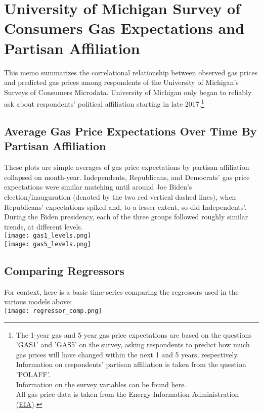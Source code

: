 \documentclass{article}
\begin{document}
\section{University of Michigan Survey of Consumers Gas Expectations and Partisan Affiliation}

This memo summarizes the correlational relationship between observed gas prices and predicted gas prices among respondents of the University of Michigan's Surveys of Consumers Microdata. University of Michigan only began to reliably ask about respondents' political affiliation starting in late 2017.\footnote{The 1-year gas and 5-year gas price expectations are based on the questions 'GAS1' and 'GAS5' on the survey, asking respondents to predict how much gas prices will have changed within the next 1 and 5 years, respectively. \\  Information on respondents' partisan affiliation is taken from the question 'POLAFF'. \\ Information on the survey variables can be found \href{https://sda.umsurvey.org/sca/Doc/sca.htm}{here}. \\ All gas price data is taken from the Energy Information Administration (\href{https://www.eia.gov/dnav/pet/hist/LeafHandler.ashx?n=pet&s=emm_epm0_pte_nus_dpg&f=m}{EIA}).}

\subsection{Average Gas Price Expectations Over Time By Partisan Affiliation}

These plots are simple averages of gas price expectations by partisan affiliation collapsed on month-year. Independents, Republicans, and Democrats' gas price expectations were similar matching until around Joe Biden's election/inauguration (denoted by the two red vertical dashed lines), when Republicans' expectations spiked and, to a lesser extent, so did Independents'. During the Biden presidency, each of the three groups followed roughly similar trends, at different levels. \\

\centering \texttt{[image: gas1\_levels.png]} \\
\texttt{[image: gas5\_levels.png]}

\raggedright \subsection{Comparing Regressors} 
For context, here is a basic time-series comparing the regressors used in the various models above: \\
\vspace{0.1in}
\centering \texttt{[image: regressor\_comp.png]} 
\end{document}
